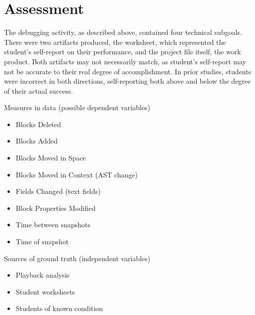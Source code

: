 \section{Assessment}

The debugging activity, as described above, contained four technical subgoals. There were two artifacts produced, the worksheet, which represented the student's self-report on their performance, and the project file itself, the work product. Both artifacts may not necessarily match, as student's self-report may not be accurate to their real degree of accomplishment. In prior studies, students were incorrect in both directions, self-reporting both above and below the degree of their actual success. 


Measures in data (possible dependent variables)
	\begin{itemize}
		\item Blocks Deleted
		\item Blocks Added
		\item Blocks Moved in Space
		\item Blocks Moved in Context (AST change)
		\item Fields Changed (text fields)
		\item Block Properties Modified
		\item Time between snapshots
		\item Time of snapshot
	\end{itemize} 

Sources of ground truth (independent variables)
	\begin{itemize}
		\item Playback analysis
		\item Student worksheets
		\item Students of known condition
	\end{itemize} 


